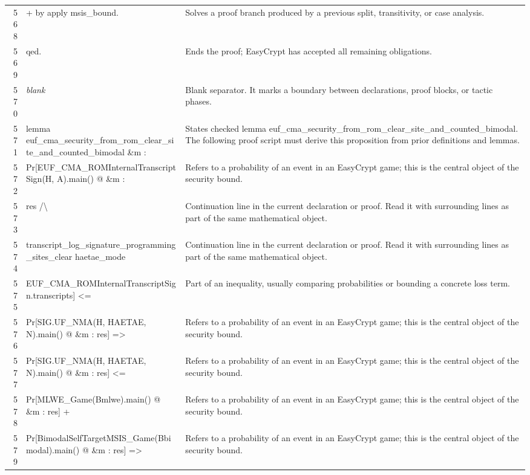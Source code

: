 \documentclass[10pt]{article}
\begin{document}
\begin{longtable}{r L{0.53\textwidth} L{0.37\textwidth}}
568 & {\ttfamily\scriptsize + by apply msis\_bound.} & Solves a proof branch produced by a previous split, transitivity, or case analysis. \\
569 & {\ttfamily\scriptsize qed.} & Ends the proof; EasyCrypt has accepted all remaining obligations. \\
570 & {\ttfamily\scriptsize \emph{blank}} & Blank separator.  It marks a boundary between declarations, proof blocks, or tactic phases. \\
571 & {\ttfamily\scriptsize lemma euf\_cma\_security\_from\_rom\_clear\_site\_and\_counted\_bimodal \&m :} & States checked lemma euf\_cma\_security\_from\_rom\_clear\_site\_and\_counted\_bimodal.  The following proof script must derive this proposition from prior definitions and lemmas. \\
572 & {\ttfamily\scriptsize   Pr[EUF\_CMA\_ROMInternalTranscriptSign(H, A).main() @ \&m :} & Refers to a probability of an event in an EasyCrypt game; this is the central object of the security bound. \\
573 & {\ttfamily\scriptsize       res /\textbackslash{}} & Continuation line in the current declaration or proof.  Read it with surrounding lines as part of the same mathematical object. \\
574 & {\ttfamily\scriptsize       transcript\_log\_signature\_programming\_sites\_clear haetae\_mode} & Continuation line in the current declaration or proof.  Read it with surrounding lines as part of the same mathematical object. \\
575 & {\ttfamily\scriptsize         EUF\_CMA\_ROMInternalTranscriptSign.transcripts] <=} & Part of an inequality, usually comparing probabilities or bounding a concrete loss term. \\
576 & {\ttfamily\scriptsize     Pr[SIG.UF\_NMA(H, HAETAE, N).main() @ \&m : res] =>} & Refers to a probability of an event in an EasyCrypt game; this is the central object of the security bound. \\
577 & {\ttfamily\scriptsize   Pr[SIG.UF\_NMA(H, HAETAE, N).main() @ \&m : res] <=} & Refers to a probability of an event in an EasyCrypt game; this is the central object of the security bound. \\
578 & {\ttfamily\scriptsize     Pr[MLWE\_Game(Bmlwe).main() @ \&m : res] +} & Refers to a probability of an event in an EasyCrypt game; this is the central object of the security bound. \\
579 & {\ttfamily\scriptsize     Pr[BimodalSelfTargetMSIS\_Game(Bbimodal).main() @ \&m : res] =>} & Refers to a probability of an event in an EasyCrypt game; this is the central object of the security bound. \\

\end{longtable}
\end{document}
